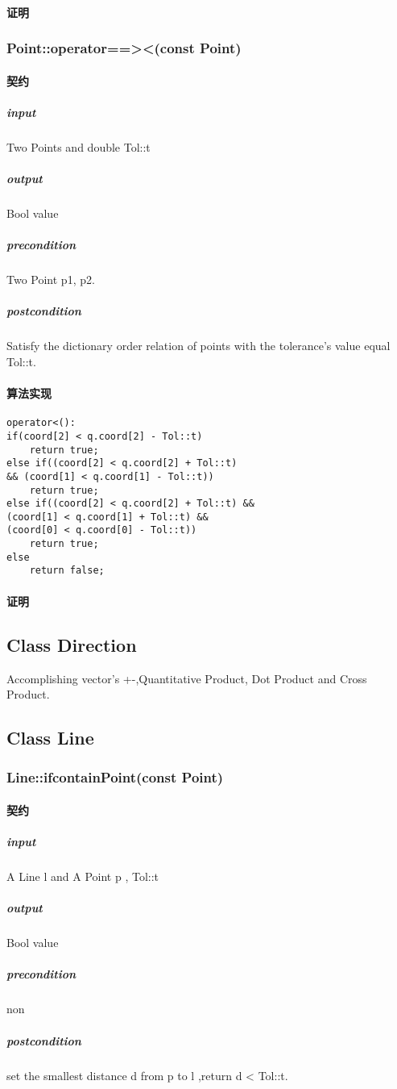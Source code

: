 \documentclass[a4paper]{book}
\numberwithin{equation}{chapter}
\theoremstyle{definition}
\begin{document}
\begin{multicols}{2}
\paragraph{证明}

\subsubsection{Point::operator==><(const Point)}
\paragraph{契约}
\subparagraph{input}
Two Points and double Tol::t
\subparagraph{output}
Bool value
\subparagraph{precondition}
Two Point p1, p2.
\subparagraph{postcondition}
Satisfy the dictionary order relation of points with the tolerance's value equal Tol::t.
\paragraph{算法实现}
\begin{lstlisting}
operator<():
if(coord[2] < q.coord[2] - Tol::t)
	return true;
else if((coord[2] < q.coord[2] + Tol::t)
&& (coord[1] < q.coord[1] - Tol::t))
	return true;
else if((coord[2] < q.coord[2] + Tol::t) &&
(coord[1] < q.coord[1] + Tol::t) &&
(coord[0] < q.coord[0] - Tol::t))
	return true;
else
	return false;

\end{lstlisting}
\paragraph{证明}

\subsection{Class Direction}

Accomplishing vector's +-,Quantitative Product, Dot Product and Cross Product.


\subsection{Class Line}
\subsubsection{Line::ifcontainPoint(const Point)}
\paragraph{契约}
\subparagraph{input}
A Line l and A Point p , Tol::t
\subparagraph{output}
Bool value
\subparagraph{precondition}
non
\subparagraph{postcondition}
set the smallest distance d from p to l ,return d < Tol::t.

\end{multicols}
\end{document}
